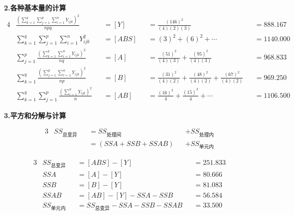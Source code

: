 \textbf{2.各种基本量的计算}
\begin{alignat*}{4}
    &\frac{\left( \sum_{k=1}^q{\sum_{j=1}^p{\sum_{i=1}^n{Y_{ijk}}}} \right) ^2}{npq}
    &&=\left[ Y \right] 
    &&=\frac{\left( 146 \right) ^2}{\left( 4 \right) \left( 2 \right) \left( 3 \right)}
    &&= 888.167\\
    &\sum_{k=1}^q{\sum_{j=1}^p{\sum_{i=1}^n{Y_{ijk}^{2}}}}
    &&=\left[ ABS \right] 
    &&=\left( 3 \right) ^2+\left( 6 \right) ^2+\cdots 
    &&=1140.000\\
    &\sum_{j=1}^p{\frac{\left( \sum_{k=1}^q{\sum_{i=1}^n{Y_{ijk}}} \right) ^2}{nq}}
    &&=\left[ A \right] 
    &&=\frac{\left( 51 \right) ^2}{\left( 4 \right) \left( 3 \right)}+\frac{\left( 95 \right) ^2}{\left( 4 \right) \left( 3 \right)}
    &&=968.833\\
    &\sum_{k=1}^q{\frac{\left( \sum_{j=1}^p{\sum_{i=1}^n{Y_{ijk}}} \right) ^2}{np}}
    &&=\left[ B \right] 
    &&=\frac{\left( 31 \right) ^2}{\left( 4 \right) \left( 2 \right)}+\frac{\left( 48 \right) ^2}{\left( 4 \right) \left( 2 \right)}+\frac{\left( 67 \right) ^2}{\left( 4 \right) \left( 2 \right)}
    &&=969.250\\
    &\sum_{k=1}^q{\sum_{j=1}^p{\frac{\left( \sum_{i=1}^n{Y_{ijk}} \right) ^2}{n}}}
    &&=\left[ AB \right] 
    &&=\frac{\left( 16 \right) ^2}{4}+\frac{\left( 15 \right) ^2}{4}+\cdots 
    &&=1106.500
\end{alignat*}


\textbf{3.平方和分解与计算}

\begin{definition}[两因素完全随机平方和分解]
\begin{alignat*}{3}
    &    SS_{\text{总变异}}     &&=    SS_{\text{处理间}}    &&+    SS_{\text{处理内}}\\
    &                           &&=    \left( SSA + SSB + SSAB \right) &&+ SS_{\text{单元内}}
\end{alignat*}
\end{definition}

\begin{alignat*}{3}
    &    SS_{\text{总变异}}    &&=    [ABS] - [Y]                              &&=    251.833\\
    &    SSA                   &&=    [A]   - [Y]                              &&=    80.666\\
    &    SSB                   &&=    [B] - [Y]                                &&=     81.083\\
    &    SSAB                  &&=    [AB] - [Y] - SSA - SSB                   &&=    56.584\\
    &    SS_{\text{单元内}}    &&=     SS_{\text{总变异}} - SSA -SSB - SSAB     &&= 33.500
\end{alignat*}

